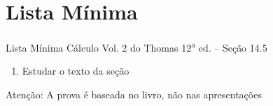 \section{Lista Mínima}

\begin{frame}{Lista Mínima}
  Cálculo Vol. 2 do Thomas 12\textsuperscript{a} ed. -- Seção 14.5
  \begin{enumerate}
    \item Estudar o texto da seção
  \end{enumerate}
  \vfill
  Atenção: A prova é baseada no livro, não nas apresentações
\end{frame}

\begin{frame}
  \tableofcontents
\end{frame}



